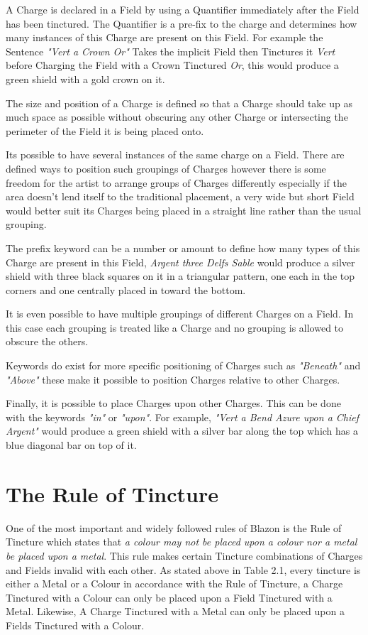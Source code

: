 A Charge is declared in a Field by using a Quantifier immediately after the Field has been tinctured.  The Quantifier is a pre-fix to the charge and determines how many instances of this Charge are present on this Field.  For example the Sentence \emph{"Vert a Crown Or"} Takes the implicit Field then Tinctures it \emph{Vert} before Charging the Field with a Crown Tinctured \emph{Or}, this would produce a green shield with a gold crown on it. 

The size and position of a Charge is defined so that a Charge should take up as much space as possible without obscuring any other Charge or intersecting the perimeter of the Field it is being placed onto.  

Its possible to have several instances of the same charge on a Field. There are defined ways to position such groupings of Charges however there is some freedom for the artist to arrange groups of Charges differently especially if the area doesn't lend itself to the traditional placement, a very wide but short Field would better suit its Charges being placed in a straight line rather than the usual grouping.

The prefix keyword can be a number or amount to define how many types of this Charge are present in this Field, \emph{Argent three Delfs Sable} would produce a silver shield with three black squares on it in a triangular pattern, one each in the  top corners and one centrally placed in toward the bottom. 

It is even possible to have multiple groupings of different Charges on a Field.  In this case each grouping is treated like a Charge and no grouping is allowed to obscure the others.  

Keywords do exist for more specific positioning of Charges such as \emph{"Beneath"} and \emph{"Above"} these make it possible to position Charges relative to other Charges.

Finally, it is possible to place Charges upon other Charges.  This can be done with the keywords \emph{"in"} or \emph{"upon"}. For example, \emph{"Vert a Bend Azure upon a Chief Argent"} would produce a green shield with a silver bar along the top which has a blue diagonal bar on top of it.




\section{The Rule of Tincture}
One of the most important and widely followed rules of Blazon is the Rule of Tincture which states that \emph{a colour may not be placed upon a colour nor a metal be placed upon a metal}\cite[p.46]{ruleofTincture}.  This rule makes certain Tincture combinations of Charges and Fields invalid with each other.  As stated above in Table 2.1, every tincture is either a Metal or a Colour in accordance with the Rule of Tincture, a Charge Tinctured with a Colour can only be placed upon a Field Tinctured with a Metal.  Likewise, A Charge Tinctured with a Metal can only be placed upon a Fields Tinctured with a Colour.  

